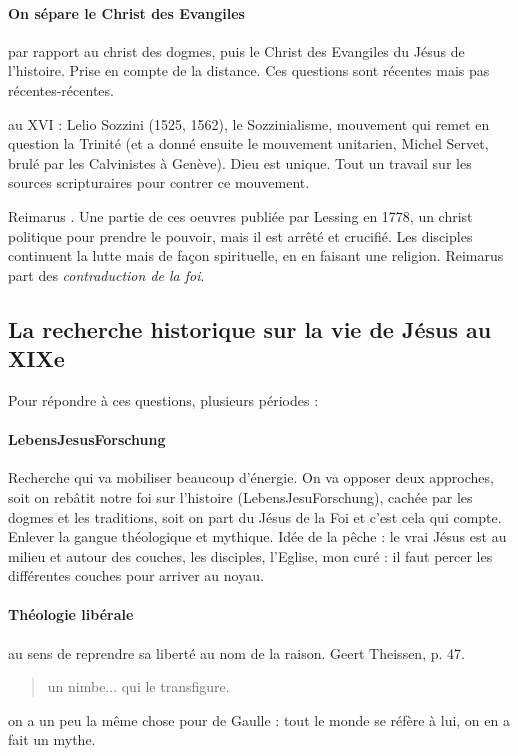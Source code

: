 \paragraph{On sépare le Christ des Evangiles} par rapport au christ des dogmes, puis le Christ des Evangiles du Jésus de l'histoire. Prise en compte de la distance. Ces questions sont récentes mais pas récentes-récentes. 
\bi 
\item au XVI : Lelio Sozzini (1525, 1562), le Sozzinialisme, mouvement qui remet en question la Trinité (et a donné ensuite le mouvement unitarien, Michel Servet, brulé par les Calvinistes à Genève). Dieu est unique. Tout un travail sur les sources scripturaires pour contrer ce mouvement.
\item Reimarus . Une partie de ces oeuvres publiée par Lessing en 1778, un christ politique pour prendre le pouvoir, mais il est arrêté et crucifié. Les disciples continuent la lutte mais de façon spirituelle, en en faisant une religion. Reimarus part des \textit{contraduction de la foi}. 
\ei 

\subsection{La recherche historique sur la vie de Jésus au XIXe}
Pour répondre à ces questions, plusieurs périodes : 

\paragraph{LebensJesusForschung} Recherche qui va mobiliser beaucoup d'énergie. On va opposer deux approches, soit on rebâtit notre foi sur l'histoire (LebensJesuForschung),  cachée par les dogmes et les traditions, soit on part du Jésus de la Foi et c'est cela qui compte. Enlever la gangue théologique et mythique. Idée de la pêche : le vrai Jésus est au milieu et autour des couches, les disciples, l'Eglise, mon curé : il faut percer les différentes couches pour arriver au noyau. 

\paragraph{Théologie libérale} au sens de reprendre sa liberté au nom de la raison. Geert Theissen, p. 47. 
\begin{quote}
    
    un nimbe... qui le transfigure. 
\end{quote}
\begin{Ex}
on a un peu la même chose pour de Gaulle : tout le monde se réfère à lui, on en a fait un mythe. 
\end{Ex}

